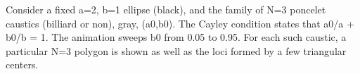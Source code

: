 Consider a fixed a=2, b=1 ellipse (black), and the family of N=3 poncelet caustics (billiard or non), gray, (a0,b0). The Cayley condition states that a0/a + b0/b = 1. The animation sweeps b0 from 0.05 to 0.95. For each such caustic, a particular N=3 polygon is shown as well as the loci formed by a few triangular centers.